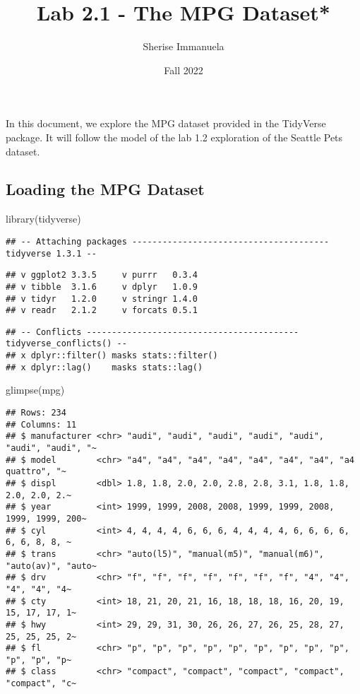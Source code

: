 \documentclass[
]{article}
\title{Lab 2.1 - The MPG Dataset*}
\author{Sherise Immanuela}
\date{Fall 2022}
\newenvironment{Shaded}{\begin{snugshade}}{\end{snugshade}}
\newcommand{\FunctionTok}[1]{\textcolor[rgb]{0.00,0.00,0.00}{#1}}
\newcommand{\NormalTok}[1]{#1}
\begin{document}
\maketitle

In this document, we explore the MPG dataset provided in the TidyVerse
package. It will follow the model of the lab 1.2 exploration of the
Seattle Pets dataset.

\hypertarget{loading-the-mpg-dataset}{%
\subsection{Loading the MPG Dataset}\label{loading-the-mpg-dataset}}

\begin{Shaded}
\begin{Highlighting}[]
\FunctionTok{library}\NormalTok{(tidyverse)}
\end{Highlighting}
\end{Shaded}

\begin{verbatim}
## -- Attaching packages --------------------------------------- tidyverse 1.3.1 --
\end{verbatim}

\begin{verbatim}
## v ggplot2 3.3.5     v purrr   0.3.4
## v tibble  3.1.6     v dplyr   1.0.9
## v tidyr   1.2.0     v stringr 1.4.0
## v readr   2.1.2     v forcats 0.5.1
\end{verbatim}

\begin{verbatim}
## -- Conflicts ------------------------------------------ tidyverse_conflicts() --
## x dplyr::filter() masks stats::filter()
## x dplyr::lag()    masks stats::lag()
\end{verbatim}

\begin{Shaded}
\begin{Highlighting}[]
\FunctionTok{glimpse}\NormalTok{(mpg)}
\end{Highlighting}
\end{Shaded}

\begin{verbatim}
## Rows: 234
## Columns: 11
## $ manufacturer <chr> "audi", "audi", "audi", "audi", "audi", "audi", "audi", "~
## $ model        <chr> "a4", "a4", "a4", "a4", "a4", "a4", "a4", "a4 quattro", "~
## $ displ        <dbl> 1.8, 1.8, 2.0, 2.0, 2.8, 2.8, 3.1, 1.8, 1.8, 2.0, 2.0, 2.~
## $ year         <int> 1999, 1999, 2008, 2008, 1999, 1999, 2008, 1999, 1999, 200~
## $ cyl          <int> 4, 4, 4, 4, 6, 6, 6, 4, 4, 4, 4, 6, 6, 6, 6, 6, 6, 8, 8, ~
## $ trans        <chr> "auto(l5)", "manual(m5)", "manual(m6)", "auto(av)", "auto~
## $ drv          <chr> "f", "f", "f", "f", "f", "f", "f", "4", "4", "4", "4", "4~
## $ cty          <int> 18, 21, 20, 21, 16, 18, 18, 18, 16, 20, 19, 15, 17, 17, 1~
## $ hwy          <int> 29, 29, 31, 30, 26, 26, 27, 26, 25, 28, 27, 25, 25, 25, 2~
## $ fl           <chr> "p", "p", "p", "p", "p", "p", "p", "p", "p", "p", "p", "p~
## $ class        <chr> "compact", "compact", "compact", "compact", "compact", "c~
\end{verbatim}
\end{document}
